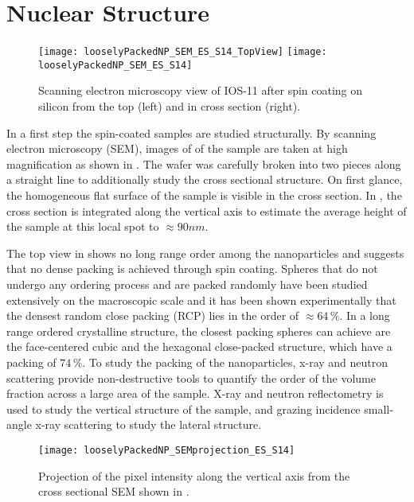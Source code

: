 \documentclass[\main/dresen_thesis.tex]{subfiles}
\begin{document}
  \section{Nuclear Structure}
    \begin{figure}[tb]
      \centering
      \texttt{[image: looselyPackedNP\_SEM\_ES\_S14\_TopView]}
      \texttt{[image: looselyPackedNP\_SEM\_ES\_S14]}
      \caption{\label{fig:looselyPackedNP:nuclearStructure:sem}Scanning electron microscopy view of IOS-11 after spin coating on silicon from the top (left) and in cross section (right).}
    \end{figure}
    In a first step the spin-coated samples are studied structurally.
    By scanning electron microscopy (SEM), images of of the sample are taken at high magnification as shown in .
    The wafer was carefully broken into two pieces along a straight line to additionally study the cross sectional structure.
    On first glance, the homogeneous flat surface of the sample is visible in the cross section.
    In , the cross section is integrated along the vertical axis to estimate the average height of the sample at this local spot to $\approx 90 \unit{nm}$.

    The top view in  shows no long range order among the nanoparticles and suggests that no dense packing is achieved through spin coating.
    Spheres that do not undergo any ordering process and are packed randomly have been studied extensively on the macroscopic scale \cite{Torquato_2000_IsRan} and it has been shown experimentally that the densest random close packing (RCP) lies in the order of $\approx 64 \, \%$.
    In a long range ordered crystalline structure, the closest packing spheres can achieve are the face-centered cubic and the hexagonal close-packed structure, which have a packing of $74 \, \%$.
    To study the packing of the nanoparticles, x-ray and neutron scattering provide non-destructive tools to quantify the order of the volume fraction across a large area of the sample.
    X-ray and neutron reflectometry is used to study the vertical structure of the sample, and grazing incidence small-angle x-ray scattering to study the lateral structure.

    \begin{figure}[tb]
      \centering
      \texttt{[image: looselyPackedNP\_SEMprojection\_ES\_S14]}
      \caption{\label{fig:looselyPackedNP:nuclearStructure:semProjection}Projection of the pixel intensity along the vertical axis from the cross sectional SEM shown in .}
    \end{figure}
\end{document}
